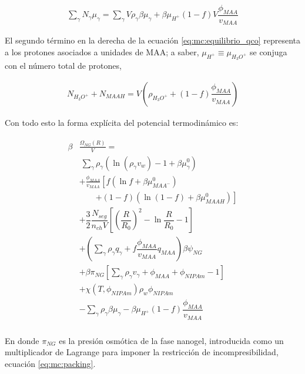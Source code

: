 	
	\begin{align}
		\sum_\gamma N_\gamma \mu_\gamma = \sum_{\gamma }V{\rho_\gamma\beta\mu_\gamma}
		+ \beta\mu_{H^+}(1-f)V\dfrac{\phi_{MAA}}{v_{MAA}}
		\label{eq:mc:equilibrio_qco}
	\end{align}
	
	El segundo t\'ermino en la derecha de la ecuaci\'on \ref{eq:mc:equilibrio_qco} representa a los protones asociados a unidades de MAA;
	a saber, $\mu_{H^+}\equiv\mu_{H_3O^+}$ se conjuga con el n\'umero total de protones,
	
	\begin{align}
		N_{H_3O^+}+N_{MAAH}=V\left(\rho_{H_3O^+}+(1-f)\dfrac{\phi_{MAA}}{v_{MAA}}\right)
		\label{eq:mc:equilibrio}
	\end{align}
	
	
	
	Con todo esto la forma expl\'icita del potencial termodin\'amico es:
	
	
	
	
	\begin{align}
		\begin{aligned}
			\beta&\frac{\Omega_{NG}(R)}{V}=\\& ~ \sum_{\gamma} \rho_\gamma\left(\ln\left(\rho_\gamma v_w\right) -1 + \beta\mu^0_\gamma\right) \\
			& + \frac{\phi_{MAA}}{v_{MAA}} \left[f(\ln f+ \beta\mu^0_{MAA^-})\right.\\
			&\qquad\left.+(1-f)(\ln (1-f)+\beta\mu^0_{MAAH})\right] \\
			& + \dfrac{3}{2}\dfrac{N_{seg}}{n_{ch} V}\left[\left(\dfrac{R}{R_0}\right)^2 - \ln\dfrac{R}{R_0} -1\right] \\
			& +  \left(\sum_{\gamma } {\rho_\gamma q_\gamma + f\dfrac{\phi_{MAA}}{v_{MAA}}q_{MAA}}\right)\beta\psi_{NG}\\
			& +\beta\pi_{NG} \left[ \sum_{\gamma } \rho_\gamma v_\gamma  + \phi_{MAA} + \phi_{NIPAm} -1 \right] \\
			& + \chi (T, \phi_{NIPAm})\rho_w \phi_{NIPAm} \\
			& -\sum_{\gamma }{\rho_\gamma\beta\mu_\gamma}
			-\beta\mu_{H^+}(1-f)\dfrac{\phi_{MAA}}{v_{MAA}}\\
		\end{aligned}
		\label{eq:mc:free-energy}
	\end{align}
	
	
	
	
	\noindent En donde $\pi_{NG}$ es la presi\'on osm\'otica de la fase nanogel, introducida como un multiplicador de Lagrange para imponer la restricci\'on de incompresibilidad, ecuaci\'on \ref{eq:mc:packing}.
	
